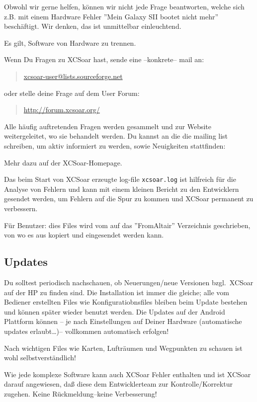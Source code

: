 Obwohl wir gerne helfen, können wir nicht jede Frage beantworten, welche sich z.B. mit einem 
Hardware Fehler ''Mein  Galaxy SII bootet nicht mehr'' beschäftigt. Wir denken, das ist unmittelbar einleuchtend.

Es gilt, Software von Hardware zu trennen. 

Wenn Du Fragen zu \textsf{XCSoar} hast, sende eine --konkrete-- mail an: 

\begin{quote}
\url{xcsoar-user@lists.sourceforge.net}
\end{quote}
oder stelle deine Frage auf dem User Forum:
\begin{quote}
\url{http://forum.xcsoar.org/}
\end{quote}

Alle häufig auftretenden Fragen werden gesammelt und zur Website weitergeleitet, wo sie behandelt werden.
Du kannst an die die mailing list schreiben, um aktiv informiert zu werden, sowie Neuigkeiten stattfinden: 

Mehr dazu auf der \textsf{XCSoar}-Homepage. 
\begin{quote}
\xcsoarwebsite{}
\end{quote}

Das beim Start von \textsf{XCSoar} erzeugte log-file \verb|xcsoar.log| ist hilfreich für die Analyse von Fehlern und kann  
mit einem kleinen Bericht zu den Entwicklern gesendet werden, um Fehlern auf die Spur zu kommen 
und \textsf{XCSoar} permanent zu verbessern. 

Für \al Benutzer: dies Files wird vom \al auf das ''FromAltair'' Verzeichnis geschrieben, von wo es aus kopiert 
und eingesendet werden kann. 

\subsection*{Updates}
Du solltest periodisch nachschauen, ob Neuerungen/neue Versionen  bzgl.\ \textsf{XCSoar} auf der HP zu finden sind. 
Die Installation ist immer die gleiche; alle vom Bediener erstellten Files wie Konfiguratiobnsfiles 
bleiben beim Update bestehen und können später wieder benutzt werden. Die Updates auf der Android Plattform können -- je nach Einstellungen auf Deiner Hardware  (automatische updates erlaubt\dots)-- vollkommen automatisch erfolgen! 

Nach wichtigen Files wie Karten, Lufträumen und Wegpunkten zu schauen ist wohl selbstverständlich!


Wie jede komplexe Software kann auch \textsf{XCSoar} Fehler enthalten und ist \textsf{XCSoar} darauf angewiesen, daß diese dem Entwicklerteam zur  Kontrolle/Korrektur zugehen. Keine Rückmeldung--keine Verbesserung!

